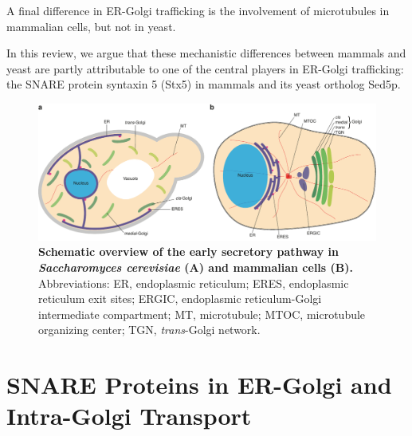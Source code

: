 A final difference in ER-Golgi trafficking is the involvement of microtubules in mammalian cells, but not in yeast\cite{cottam_retrograde_2012,papanikou_yeast_2009,jackson_mechanisms_2009}.

In this review, we argue that these mechanistic differences between mammals and yeast are partly attributable to one of the central players in ER-Golgi trafficking: the SNARE protein syntaxin 5 (Stx5) in mammals and its yeast ortholog Sed5p.

\begin{figure}
    \includegraphics[keepaspectratio=true,width=\textwidth,height=\textheight]{chapters/chapter5/chapter5_Figure1}
    \caption{\textbf{Schematic overview of the early secretory pathway in \emph{Saccharomyces cerevisiae} (A) and mammalian cells (B).} Abbreviations: ER, endoplasmic reticulum; ERES, endoplasmic reticulum exit sites; ERGIC, endoplasmic reticulum-Golgi intermediate compartment; MT, microtubule; MTOC, microtubule organizing center; TGN, \emph{trans}-Golgi network.}
    \label{fig:ch5fig1}
\end{figure}

\section{SNARE Proteins in ER-Golgi and Intra-Golgi Transport}

